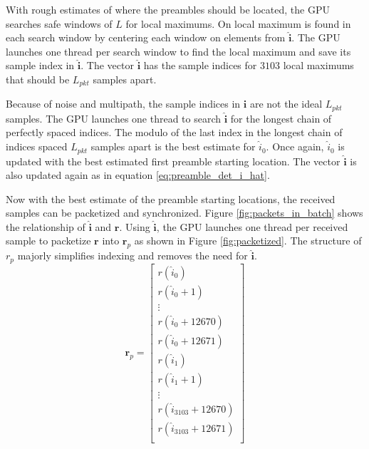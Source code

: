 With rough estimates of where the preambles should be located, the GPU searches safe windows of $L$ for local maximums.
On local maximum is found in each search window by centering each window on elements from $\hat{\mathbf{i}}$.
The GPU launches one thread per search window to find the local maximum and save its sample index in $\hat{\mathbf{i}}$.
The vector $\hat{\mathbf{i}}$ has the sample indices for $3103$ local maximums that should be $ L_{pkt} $ samples apart.

Because of noise and multipath, the sample indices in $\hat{\mathbf{i}}$ are not the ideal $ L_{pkt} $ samples.
The GPU launches one thread to search $\hat{\mathbf{i}}$ for the longest chain of perfectly spaced indices.
The modulo of the last index in the longest chain of indices spaced $ L_{pkt} $ samples apart is the best estimate for $\hat{i}_0$.
Once again, $\hat{i}_0$ is updated with the best estimated first preamble starting location.
The vector $\hat{\mathbf{i}}$ is also updated again as in equation \eqref{eq:preamble_det_i_hat}. 

Now with the best estimate of the preamble starting locations, the received samples can be packetized and synchronized.
Figure \ref{fig:packets_in_batch} shows the relationship of $\hat{\mathbf{i}}$ and $\boldsymbol{r}$.
Using $\hat{\mathbf{i}}$, the GPU launches one thread per received sample to packetize $\boldsymbol{r}$ into $\boldsymbol{r}_p$ as shown in Figure \ref{fig:packetized}. The structure of $r_p$ majorly simplifies indexing and removes the need for $\hat{\mathbf{i}}$.
\begin{equation}
\boldsymbol{r}_p = 
\begin{bmatrix}
r(\hat{i}_0) 			\\
r(\hat{i}_0+1) 		\\
\vdots			\\
r(\hat{i}_0+12670)\\
r(\hat{i}_0+12671)\\
r(\hat{i}_1) 			\\
r(\hat{i}_1+1) 		\\
\vdots			\\
r(\hat{i}_{3103}+12670)\\
r(\hat{i}_{3103}+12671)\\
\end{bmatrix}
\end{equation}

